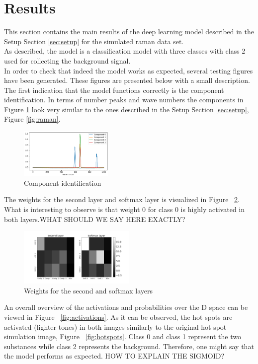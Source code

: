 \documentclass{article}
\begin{document}
\section{Results}
\label{sec:results}
This section contains the main results of the deep learning model described in the Setup Section \ref{sec:setup} for the simulated raman data set.\\
As described, the model is a classification model with three classes with class 2 used for collecting the background signal. \\%
In order to check that indeed the model works as expected, several testing figures have been generated. These figures are presented below with a small description.\\
The first indication that the model functions correctly is the component identification. In terms of number peaks and wave numbers the components in Figure \ref{fig:components} look very similar to the ones described in the Setup Section \ref{sec:setup}, Figure \ref{fig:raman}.
\begin{figure}[H]
	\centering
	\includegraphics[width=0.4\textwidth]{raman_sim_3_encode_layer_1_finetune_13.png}
	\caption{Component identification}
	\label{fig:components}
\end{figure}
%
The weights for the second layer and softmax layer is visualized in Figure ~\ref{fig:weights}. What is interesting to observe is that weight 0 for class 0 is highly activated in both layers.WHAT SHOULD WE SAY HERE EXACTLY?\\ 
%
\begin{figure}[H]
  \includegraphics[width=0.5\textwidth]{raman_sim_second_softmax_encode_2.png}
  \caption{Weights for the second and softmax layers}
  \label{fig:weights}
\end{figure}
%
An overall overview of the activations and probabilities over the D space can be viewed in Figure ~\ref{fig:activations}. As it can be observed, the hot spots are activated (lighter tones) in both images similarly to the original hot spot simulation image, Figure ~\ref{fig:hotspots}. Class 0 and class 1 represent the two substances while class 2 represents the background. Therefore, one might say that the model performs as expected. HOW TO EXPLAIN THE SIGMOID?
\end{document}
